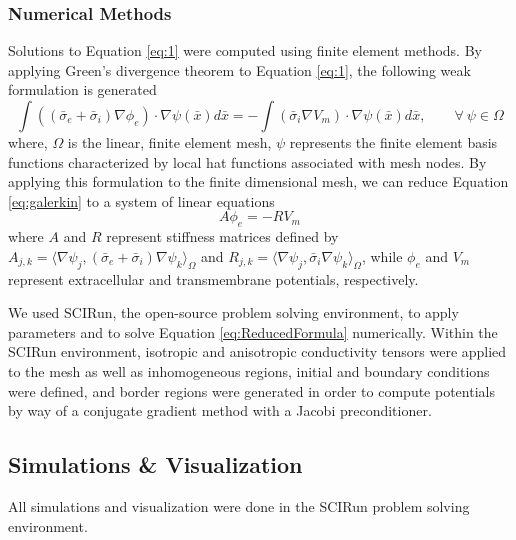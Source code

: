 \subsubsection{Numerical Methods}
\label{sec:numerical}


Solutions to Equation \ref{eq:1} were computed using finite element methods.  By applying 
Green's divergence theorem to Equation \ref{eq:1}, the following weak formulation is generated 
\begin{equation}
\int ((\bar{\sigma}_e + \bar{\sigma}_i)\nabla \phi_e) \cdot \nabla \psi(\bar{x})d\bar{x} = - \int (\bar{\sigma}
_i \nabla V_m)\cdot \nabla \psi(\bar{x})d\bar{x}, \quad \quad \forall \ \psi \in \Omega
\label{eq:galerkin}
\end{equation}
where, $\Omega$ is the linear, finite element mesh, $\psi$ represents the finite element basis functions characterized by local hat functions associated with mesh nodes. By applying this formulation to the finite dimensional mesh, we can reduce Equation \ref{eq:galerkin} to a system of linear equations 
\begin{equation}
A \phi_e = -RV_m
\label{eq:ReducedFormula}
\end{equation}
where $A$ and $R$ represent stiffness matrices defined by $A_{j,k} = \langle \nabla \psi_j,(\bar{\sigma}
_e + \bar{\sigma}_i)\nabla \psi_k \rangle_\Omega$ and $R_{j,k} = \langle \nabla \psi_j,\bar{\sigma}_i
\nabla \psi_k \rangle_\Omega$,
while $\phi_e$ and $V_m$ represent extracellular and transmembrane potentials, respectively.\cite{BMB:Wan2013}

We used SCIRun, the open-source problem solving environment, to apply parameters and to solve Equation  \ref{eq:ReducedFormula} numerically.  Within the SCIRun environment, isotropic and anisotropic conductivity tensors were applied to the mesh as well as inhomogeneous regions, initial and boundary conditions were defined, and border regions were generated in order to compute potentials by way of a conjugate gradient method with a Jacobi preconditioner.

\subsection{Simulations \& Visualization}
\label{sec:sim}

All simulations and visualization were done in the SCIRun problem solving environment.

